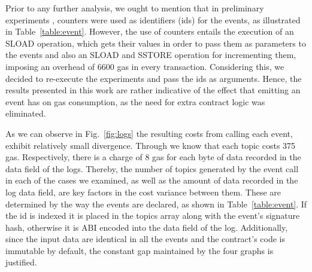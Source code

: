 Prior to any further analysis, we ought to mention that in preliminary experiments \citep{kostamis_2021}, counters were used as identifiers (ids) for the events, as illustrated in Table~\ref{table:event}. However, the use of counters entails the execution of an SLOAD operation, which gets their values in order to pass them as parameters to the events and also an SLOAD and SSTORE operation for incrementing them, imposing an overhead of 6600 gas in every transaction. Considering this, we decided to re-execute the experiments and pass the ids as arguments. Hence, the results presented in this work are rather indicative of the effect that emitting an event has on gas consumption, as the need for extra contract logic was eliminated.

As we can observe in Fig.~\ref{fig:logs} the resulting costs from calling each event, exhibit relatively small divergence. Through  \citep{wood_2014} we know that each topic costs 375 gas. Respectively, there is a charge of 8 gas for each byte of data recorded in the data field of the logs. Thereby, the number of topics generated by the event call in each of the cases we examined, as well as the amount of data recorded in the log data field, are key factors in the cost variance between them. These are determined by the way the events are declared, as shown in Table~\ref{table:event}. If the id is indexed it is placed in the topics array along with the event’s signature hash, otherwise it is ABI encoded into the data field of the log. Additionally, since the input data are identical in all the events and the contract's code is immutable by default, the constant gap maintained by the four graphs is justified.

